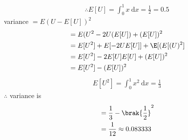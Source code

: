 \documentclass[journal,12pt,twocolumn]{IEEEtran}
\begin{document}
	\begin{align}
		\therefore E[U] = \int_{0}^{1}x ~\mathrm{d}x = \frac12 = 0.5
	\end{align}
	variance $= E(U-E[U])^2$ 
    \begin{align}
		&= E(U^2 - 2U(E[U]) + (E[U])^2 \\
		&= E[U^2] + E[-2UE[U]] + \E[(E[(U)^2] \\
		&= E[U^2] -2E[U]E[U] + (E[U])^2 \\
		&= E[U^2] - (E[U])^2 \\
	\end{align}
	\begin{align}
	E[U^2] = \int_{0}^{1}x^2 ~\mathrm{d}x = \frac{1}{3}
	\end{align}
	$\therefore$ variance is
	\begin{align}
		&= \frac{1}{3} - \brak{\frac{1}{2}}^2 \\
		&= \frac{1}{12} \approx 0.083333
	\end{align}
	
	
	
\end{document}
